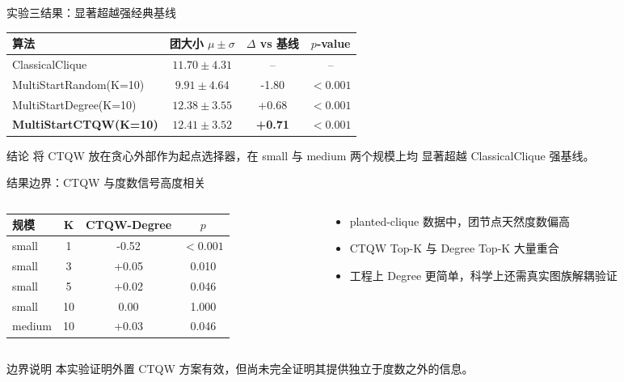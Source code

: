 \documentclass[aspectratio=169,10pt]{ctexbeamer}
\begin{document}
\begin{frame}{实验三结果：显著超越强经典基线}
  \centering
  \renewcommand{\arraystretch}{1.25}
  \begin{tabular}{lccc}
    \toprule
    算法 & 团大小 $\mu\pm\sigma$ & $\Delta$ vs 基线 & $p$-value \\
    \midrule
    ClassicalClique & $11.70\pm4.31$ & -- & -- \\
    MultiStartRandom(K=10) & $9.91\pm4.64$ & -1.80 & $<0.001$ \\
    MultiStartDegree(K=10) & $12.38\pm3.55$ & +0.68 & $<0.001$ \\
    \textbf{MultiStartCTQW(K=10)} & $\mathbf{12.41\pm3.52}$ & \textbf{+0.71} & $\mathbf{<0.001}$ \\
    \bottomrule
  \end{tabular}

  \vspace{1.2em}
  \begin{block}{结论}
    将 CTQW 放在贪心外部作为起点选择器，在 small 与 medium 两个规模上均
    显著超越 ClassicalClique 强基线。
  \end{block}
\end{frame}

\begin{frame}{结果边界：CTQW 与度数信号高度相关}
  \begin{columns}[T,onlytextwidth]
    \begin{column}{0.50\textwidth}
      \begin{tabular}{lccc}
        \toprule
        规模 & K & CTQW-Degree & $p$ \\
        \midrule
        small & 1 & -0.52 & $<0.001$ \\
        small & 3 & +0.05 & 0.010 \\
        small & 5 & +0.02 & 0.046 \\
        small & 10 & 0.00 & 1.000 \\
        medium & 10 & +0.03 & 0.046 \\
        \bottomrule
      \end{tabular}
    \end{column}
    \begin{column}{0.50\textwidth}
      \vspace{1.0em}
      \begin{itemize}
        \item planted-clique 数据中，团节点天然度数偏高
        \item CTQW Top-K 与 Degree Top-K 大量重合
        \item 工程上 Degree 更简单，科学上还需真实图族解耦验证
      \end{itemize}
    \end{column}
  \end{columns}

  \vspace{0.8em}
  \begin{alertblock}{边界说明}
    本实验证明外置 CTQW 方案有效，但尚未完全证明其提供独立于度数之外的信息。
  \end{alertblock}
\end{frame}
\end{document}

